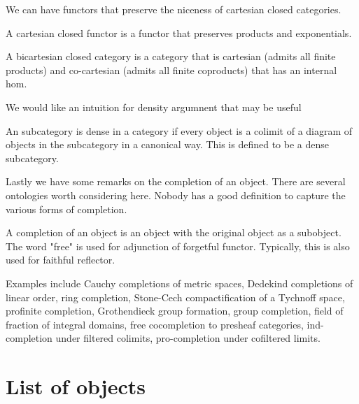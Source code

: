 We can have functors that preserve the niceness of cartesian closed categories.

\begin{definition}
    \label{definition-cartesian-closed}
    A cartesian closed functor is a functor that preserves products and exponentials.
\end{definition}

\begin{definition}
    \label{definition-bicartesian-closed}
    A bicartesian closed category is a category that is cartesian (admits all finite products) and co-cartesian (admits all finite coproducts) that has an internal hom.
\end{definition}

We would like an intuition for density argumnent that may be useful

\begin{definition}
    \label{definition-dense-in-category}
    An subcategory is dense in a category if every object is a colimit of a diagram of objects in the subcategory in a canonical way.
    This is defined to be a dense subcategory.
\end{definition}

Lastly we have some remarks on the completion of an object. There are several ontologies worth considering here.
Nobody has a good definition to capture the various forms of completion.

\begin{remark}
    A completion of an object is an object with the original object as a subobject. The word "free" is used for adjunction of forgetful functor. Typically, this is also used for faithful reflector.
    
    Examples include Cauchy completions of metric spaces, Dedekind completions of linear order, ring completion, Stone-Cech compactification of a Tychnoff space, profinite completion, Grothendieck group formation, group completion, field of fraction of integral domains, free cocompletion to presheaf categories, ind-completion under filtered colimits, pro-completion under cofiltered limits.
\end{remark}

\section{List of objects}

